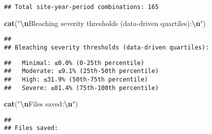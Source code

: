 \documentclass[
]{article}
\newenvironment{Shaded}{\begin{snugshade}}{\end{snugshade}}
\newcommand{\ControlFlowTok}[1]{\textcolor[rgb]{0.13,0.29,0.53}{\textbf{#1}}}
\newcommand{\DecValTok}[1]{\textcolor[rgb]{0.00,0.00,0.81}{#1}}
\newcommand{\FunctionTok}[1]{\textcolor[rgb]{0.13,0.29,0.53}{\textbf{#1}}}
\newcommand{\NormalTok}[1]{#1}
\newcommand{\SpecialCharTok}[1]{\textcolor[rgb]{0.81,0.36,0.00}{\textbf{#1}}}
\newcommand{\StringTok}[1]{\textcolor[rgb]{0.31,0.60,0.02}{#1}}
\begin{document}
\begin{verbatim}
## Total site-year-period combinations: 165
\end{verbatim}

\begin{Shaded}
\begin{Highlighting}[]
\FunctionTok{cat}\NormalTok{(}\StringTok{"}\SpecialCharTok{\textbackslash{}n}\StringTok{Bleaching severity thresholds (data{-}driven quartiles):}\SpecialCharTok{\textbackslash{}n}\StringTok{"}\NormalTok{)}
\end{Highlighting}
\end{Shaded}

\begin{verbatim}
## 
## Bleaching severity thresholds (data-driven quartiles):
\end{verbatim}

\begin{Shaded}
\end{Shaded}

\begin{verbatim}
##   Minimal: ≤0.0% (0-25th percentile)
##   Moderate: ≤9.1% (25th-50th percentile)
##   High: ≤31.9% (50th-75th percentile)
##   Severe: ≤81.4% (75th-100th percentile)
\end{verbatim}

\begin{Shaded}
\begin{Highlighting}[]
\FunctionTok{cat}\NormalTok{(}\StringTok{"}\SpecialCharTok{\textbackslash{}n}\StringTok{Files saved:}\SpecialCharTok{\textbackslash{}n}\StringTok{"}\NormalTok{)}
\end{Highlighting}
\end{Shaded}

\begin{verbatim}
## 
## Files saved:
\end{verbatim}
\end{document}
